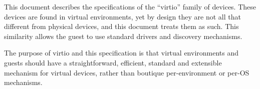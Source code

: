 This document describes the specifications of the “virtio” family of
devices. These devices are found in virtual environments, yet by
design they are not all that different from physical devices, and this
document treats them as such. This similarity allows the guest to use standard
drivers and discovery mechanisms.

The purpose of virtio and this specification is that virtual
environments and guests should have a straightforward, efficient,
standard and extensible mechanism for virtual devices, rather
than boutique per-environment or per-OS mechanisms.
